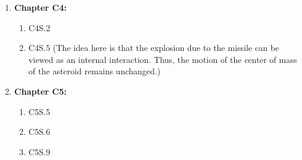 \documentclass[12pt]{article}
\begin{document}
\begin{enumerate}
\setlength{\itemsep}{-1mm}
\item {\bf Chapter C4:}
  \begin{enumerate}
  \item C4S.2
  \item C4S.5 (The idea here is that the explosion due to the missile
    can be viewed as an internal interaction. Thus, the motion of the
    center of mass of the asteroid remains unchanged.)
  \end{enumerate}

\item {\bf Chapter C5:}
  \begin{enumerate}
  \item C5S.5
  \item C5S.6
  \item C5S.9
  \end{enumerate}
\end{enumerate}
\end{document}

